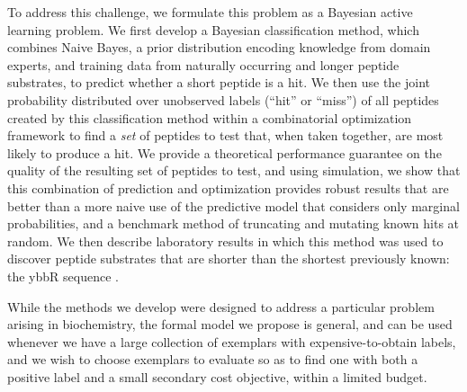 \documentclass[12pt]{article}
\begin{document}
To address this challenge, we formulate this problem as a Bayesian active learning problem.  We first develop a Bayesian classification method, which combines Naive Bayes, a prior distribution encoding knowledge from domain experts, and training data from naturally occurring and longer peptide substrates, to predict whether a short peptide is a hit. We then use the joint probability distributed over unobserved labels (``hit'' or ``miss'') of all peptides created by this classification method within a combinatorial optimization framework to find a {\it set} of peptides to test that, when taken together, are most likely to produce a hit.  We provide a theoretical performance guarantee on the quality of the resulting set of peptides to test, and using simulation, we show that this combination of prediction and optimization provides robust results that are better than a more naive use of the predictive model that considers only marginal probabilities, and a benchmark method of truncating and mutating known hits at random. We then describe laboratory results in which this method was used to discover peptide substrates that are shorter than the shortest previously known: the ybbR sequence \citep{ybbr}.



While the methods we develop were designed to address a particular problem arising in biochemistry, the formal model we propose is general, and can be used whenever we have a large collection of exemplars with expensive-to-obtain labels, and we wish to choose exemplars to evaluate so as to find one with both a positive label and a small secondary cost objective, within a limited budget.
\end{document}
